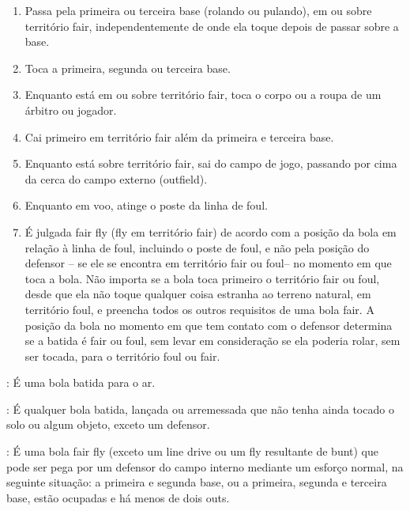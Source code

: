 \begin{description}
\begin{enumerate}[label=\alph*)]
		\item  Passa pela primeira ou terceira base (rolando ou pulando), em ou sobre territ\'orio \gls{fair}, independentemente de onde ela toque depois de passar sobre a base. 
		
		\item  Toca a primeira, segunda ou terceira base. 
		
		\item  Enquanto est\'a em ou sobre territ\'orio \gls{fair}, toca o corpo ou a roupa de um \'arbitro ou jogador. 
		
		\item  Cai primeiro em territ\'orio \gls{fair} al\'em da primeira e terceira base. 
		
		\item  Enquanto est\'a sobre territ\'orio \gls{fair}, sai do campo de jogo, passando por cima da cerca do campo externo (\gls{outfield}). 
		
		\item  Enquanto em voo, atinge o poste da linha de \gls{foul}. 
		
		\item  \'E julgada \gls{fair fly} (\gls{fly} em territ\'orio \gls{fair}) de acordo com a posi\c{c}\~ao da bola em rela\c{c}\~ao \`a linha de \gls{foul}, incluindo o poste de \gls{foul}, e n\~ao pela posi\c{c}\~ao do defensor – se ele se encontra em territ\'orio \gls{fair} ou \gls{foul}– no momento em que toca a bola. N\~ao importa se a bola toca primeiro o territ\'orio \gls{fair} ou \gls{foul}, desde que ela n\~ao toque qualquer coisa estranha ao terreno natural, em territ\'orio \gls{foul}, e preencha todos os outros requisitos de uma bola \gls{fair}. A posi\c{c}\~ao da bola no momento em que tem contato com o defensor determina se a batida \'e \gls{fair} ou \gls{foul}, sem levar em considera\c{c}\~ao se ela poderia rolar, sem ser tocada, para o territ\'orio \gls{foul} ou \gls{fair}. 
	\end{enumerate}
	
	\item[Bola \gls{fly}]: \'E uma bola batida para o ar. 
	
	\item[bola em v\^oo]:
	\'E qualquer bola batida, lan\c{c}ada ou arremessada que n\~ao tenha ainda tocado o solo ou algum objeto, exceto um defensor. 
	
	\item[\Gls{homeplate}]: \'E uma bola \gls{fair fly} (exceto um \gls{line drive} ou um \gls{fly} resultante de \gls{bunt}) que pode ser pega por um defensor do campo interno mediante um esfor\c{c}o normal, na seguinte situa\c{c}\~ao: a primeira e segunda base, ou a primeira, segunda e terceira base, est\~ao ocupadas e h\'a menos de dois \glspl{out}. 
	

\end{description}

